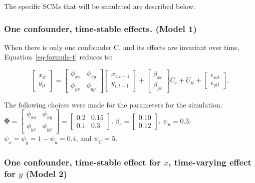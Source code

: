 \documentclass[
]{interact}
\begin{document}
The specific SCMs that will be simulated are described below.

\hypertarget{one-confounder-time-stable-effects.-model-1}{%
\subsubsection{One confounder, time-stable effects. (Model
1)}\label{one-confounder-time-stable-effects.-model-1}}

When there is only one confounder C, and its effects are invariant over
time, Equation~\ref{eq-formula-t} reduces to:

\[
\begin{bmatrix}
x_{it}\\
y_{it}
\end{bmatrix}
=
\begin{bmatrix}
\phi_{xx} & \phi_{xy}\\
\phi_{yx} & \phi_{yy}
\end{bmatrix}
\begin{bmatrix}
x_{i,t-1}\\
y_{i,t-1}
\end{bmatrix}
+
\begin{bmatrix}
\beta_{xc}\\
\beta_{yc}
\end{bmatrix}
C_{i} +
U_{it} +
\begin{bmatrix}
\epsilon_{xit}\\
\epsilon_{yit}
\end{bmatrix}.
\]

The following choices were made for the parameters for the simulation:
\(\boldsymbol{\Phi} = \begin{bmatrix} \phi_{xx} & \phi_{xy}\\ \phi_{yx} & \phi_{yy} \end{bmatrix} = \begin{bmatrix} 0.2 & 0.15\\ 0.1 & 0.3 \end{bmatrix}\),
\(\beta_{c} = \begin{bmatrix} 0.10\\0.12 \end{bmatrix}\),
\(\psi_u = 0.3\), \(\psi_x = \psi_y = 1 - \psi_u = 0.4\), and
\(\psi_C = 5\).

\hypertarget{one-confounder-time-stable-effect-for-x-time-varying-effect-for-y-model-2}{%
\subsubsection{\texorpdfstring{One confounder, time-stable effect for
\(x\), time-varying effect for \(y\) (Model
2)}{One confounder, time-stable effect for x, time-varying effect for y (Model 2)}}\label{one-confounder-time-stable-effect-for-x-time-varying-effect-for-y-model-2}}
\end{document}

